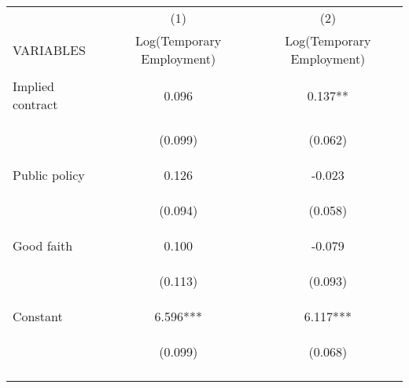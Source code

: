 \begin{center}
\begin{tabular}{lcc} \hline
 & (1) & (2) \\
VARIABLES & Log(Temporary Employment) & Log(Temporary Employment) \\ \hline
\vspace{4pt} & \begin{footnotesize}\end{footnotesize} & \begin{footnotesize}\end{footnotesize} \\
Implied contract & 0.096 & 0.137** \\
\vspace{4pt} & \begin{footnotesize}(0.099)\end{footnotesize} & \begin{footnotesize}(0.062)\end{footnotesize} \\
Public policy & 0.126 & -0.023 \\
\vspace{4pt} & \begin{footnotesize}(0.094)\end{footnotesize} & \begin{footnotesize}(0.058)\end{footnotesize} \\
Good faith & 0.100 & -0.079 \\
\vspace{4pt} & \begin{footnotesize}(0.113)\end{footnotesize} & \begin{footnotesize}(0.093)\end{footnotesize} \\
Constant & 6.596*** & 6.117*** \\
 & \begin{footnotesize}(0.099)\end{footnotesize} & \begin{footnotesize}(0.068)\end{footnotesize} \\
\vspace{4pt} & \begin{footnotesize}\end{footnotesize} & \begin{footnotesize}\end{footnotesize} \\

\end{tabular}
\end{center}
